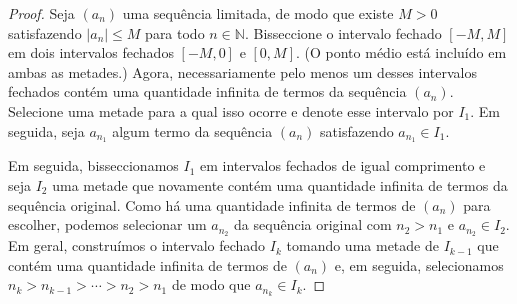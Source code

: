 \begin{proof}
Seja $(a_n)$ uma sequência limitada, de modo que existe $M > 0$ satisfazendo $|a_n| \leq M$ para todo $n \in \mathbb{N}$. Bisseccione o intervalo fechado $[-M, M]$ em dois intervalos fechados $[-M, 0]$ e $[0, M]$. (O ponto médio está incluído em ambas as metades.) Agora, necessariamente pelo menos um desses intervalos fechados contém uma quantidade infinita de termos da sequência $(a_n)$. Selecione uma metade para a qual isso ocorre e denote esse intervalo por $I_1$. Em seguida, seja $a_{n_1}$ algum termo da sequência $(a_n)$ satisfazendo $a_{n_1} \in I_1$.

\begin{center}
\end{center}

Em seguida, bisseccionamos $I_1$ em intervalos fechados de igual comprimento e seja $I_2$ uma metade que novamente contém uma quantidade infinita de termos da sequência original. Como há uma quantidade infinita de termos de $(a_n)$ para escolher, podemos selecionar um $a_{n_2}$ da sequência original com $n_2 > n_1$ e $a_{n_2} \in I_2$. Em geral, construímos o intervalo fechado $I_k$ tomando uma metade de $I_{k-1}$ que contém uma quantidade infinita de termos de $(a_n)$ e, em seguida, selecionamos $n_k > n_{k-1} > \cdots > n_2 > n_1$ de modo que $a_{n_k} \in I_k$.


\end{proof}
